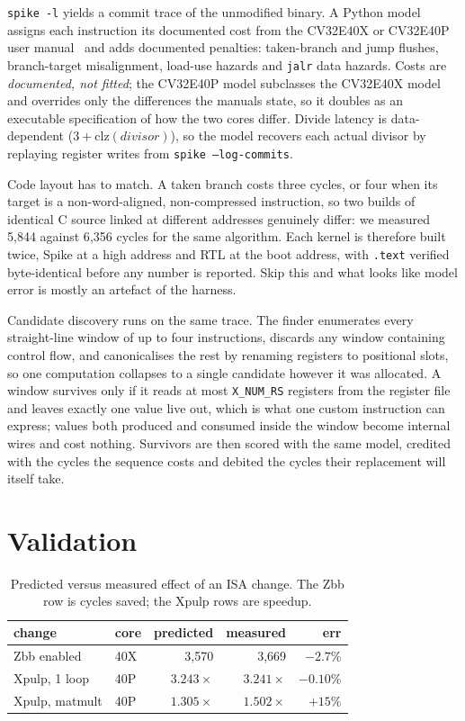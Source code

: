 \documentclass[conference,10pt]{IEEEtran}
\begin{document}
\texttt{spike -l} yields a commit trace of the unmodified binary. A Python
model assigns each instruction its documented cost from the CV32E40X or
CV32E40P user manual~\cite{cv32e40x,cv32e40p} and adds documented penalties:
taken-branch and jump flushes, branch-target misalignment, load-use hazards and
\texttt{jalr} data hazards. Costs are \emph{documented, not fitted}; the
CV32E40P model subclasses the CV32E40X model and overrides only the differences
the manuals state, so it doubles as an executable specification of how the two
cores differ. Divide latency is data-dependent
($3+\mathrm{clz}(\mathit{divisor})$), so the model recovers each actual divisor
by replaying register writes from \texttt{spike --log-commits}.

Code layout has to match. A taken branch costs three cycles, or four when its
target is a non-word-aligned, non-compressed instruction, so two builds of
identical C source linked at different addresses genuinely differ: we measured
5{,}844 against 6{,}356 cycles for the same algorithm. Each kernel is therefore
built twice, Spike at a high address and RTL at the boot address, with
\texttt{.text} verified byte-identical before any number is reported. Skip this
and what looks like model error is mostly an artefact of the harness.

Candidate discovery runs on the same trace. The finder enumerates every
straight-line window of up to four instructions, discards any window containing
control flow, and canonicalises the rest by renaming registers to positional
slots, so one computation collapses to a single candidate however it was
allocated. A window survives only if it reads at most \texttt{X\_NUM\_RS}
registers from the register file and leaves exactly one value live out, which is
what one custom instruction can express; values both produced and consumed inside
the window become internal wires and cost nothing. Survivors are then scored with
the same model, credited with the cycles the sequence costs and debited the
cycles their replacement will itself take.

\section{Validation}

\begin{table}[!t]
\centering
\caption{Predicted versus measured effect of an ISA change. The Zbb row
is cycles saved; the Xpulp rows are speedup.}
\label{tab:predict}
\footnotesize
\setlength{\tabcolsep}{4pt}
\begin{tabular}{@{}llrrr@{}}
\toprule
change & core & predicted & measured & err\\
\midrule
Zbb enabled    & 40X & 3{,}570        & 3{,}669        & $-2.7\%$\\
Xpulp, 1 loop  & 40P & $3.243\times$  & $3.241\times$  & $-0.10\%$\\
Xpulp, matmult & 40P & $1.305\times$  & $1.502\times$  & $+15\%$\\
\bottomrule
\end{tabular}
\end{table}
\end{document}
